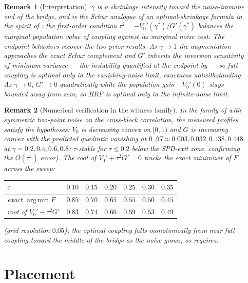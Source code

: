 \documentclass[11pt]{article}
\newtheorem{remark}{Remark}
\DeclareMathOperator*{\argminop}{arg\,min}
\begin{document}
\begin{remark}[Interpretation]
$\gamma$ is a shrinkage intensity toward the noise-immune end of the bridge,
and  is the Schur analogue of an optimal-shrinkage formula
in the spirit of \textcite{ledoitwolf2004}: the first-order condition
$\tau^2 = -V_0'(\gamma^*) / G'(\gamma^*)$ balances the marginal population
value of coupling against its marginal noise cost. The endpoint behaviors
recover the two prior results. As $\gamma \to 1$ the augmentation approaches
the exact Schur complement and $G'$ inherits the inversion sensitivity of
minimum variance --- the instability quantified at the endpoint by
\textcite{antonov2025hrp} --- so full coupling is optimal only in the
vanishing-noise limit, exactness \parencite{mograby2025} notwithstanding. As
$\gamma \to 0$, $G' \to 0$ quadratically while the population gain
$-V_0'(0)$ stays bounded away from zero, so HRP is optimal only in the
infinite-noise limit.
\end{remark}

\begin{remark}[Numerical verification in the witness family]
\label{rem:verify}
In the family of  with symmetric two-point noise on the
cross-block correlation, the measured profiles satisfy the hypotheses:
$V_0$ is decreasing convex on $[0,1)$ and $G$ is increasing convex with the
predicted quadratic vanishing at $0$ ($G \approx 0.003, 0.032, 0.138, 0.448$
at $\gamma = 0.2, 0.4, 0.6, 0.8$; $\tau$-stable for $\tau \le 0.2$ below the
SPD-exit zone, confirming the $O(\tau^4)$ error). The root of
$V_0' + \tau^2 G' = 0$ tracks the exact minimizer of $F$ across the sweep:
\begin{center}
\begin{tabular}{lcccccc}
\toprule
$\tau$ & $0.10$ & $0.15$ & $0.20$ & $0.25$ & $0.30$ & $0.35$ \\
\midrule
exact $\argminop F$      & $0.85$ & $0.70$ & $0.65$ & $0.55$ & $0.50$ & $0.45$ \\
root of $V_0' + \tau^2G'$ & $0.83$ & $0.74$ & $0.66$ & $0.59$ & $0.53$ & $0.49$ \\
\bottomrule
\end{tabular}
\end{center}
(grid resolution $0.05$); the optimal coupling falls monotonically from near
full coupling toward the middle of the bridge as the noise grows, as
 requires.
\end{remark}

\section{Placement}
\end{document}
